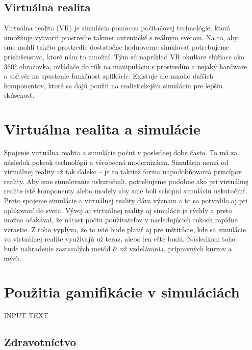 \documentclass[10pt,slovak,a4paper]{article}
\begin{document}
\subsection{Virtuálna realita} \label{Gamification:virtual_reality}

Virtuálna realita (VR) je simulácia pomocou počítačovej technológie, ktorá umožňuje vytvoriť prostredie takmer autentické s reálnym svetom. Na to, aby sme mohli takéto prostredie dostatočne hodnoverne simulovať potrebujeme príslušenstvo, ktoré nám to umožní. Tým sú napríklad VR okuliare slúžiace ako 360° obrazovka, ovládače do rúk na manipuláciu s prostredím a nejaký hardware a softvér na spustenie funkčnosť aplikácie. Existuje ale mnoho ďalších komponentov, ktoré sa dajú použiť na realistickejšiu simuláciu pre lepšiu skúsenosť. 


\section{Virtuálna realita a simulácie} \label{Simulations}

Spojenie virtuálna realita a simulácie počuť v poslednej dobe často. To má za následok pokrok technológií a všeobecná modernizácia. Simulácia nemá od virtuálnej reality až tak ďaleko – je to taktiež forma napodobňovania princípov reality. Aby sme simulovanie uskutočnili, potrebujeme podobne ako pri virtuálnej realite isté komponenty alebo modely aby sme boli schopní simuláciu uskutočniť. Preto spojenie simulácie a virtuálnej reality dáva význam a to sa potvrdilo aj pri aplikovaní do sveta. Vývoj aj virtuálnej reality aj simulácii je rýchly a preto možno očakávať, že nárast počtu používateľov v nasledujúcich rokoch rapídne vzrastie. Z toho vyplýva, že to isté bude platiť aj pre inštitúcie, kde sa simulácie vo virtuálnej realite využívajú už teraz, alebo len ešte budú. Následkom toho bude nahradenie zastaralých metód či už vzdelávania, prípravných kurzov a iných. 


\section{Použitia gamifikácie v simuláciách} \label{Uses}

INPUT TEXT

\subsection{Zdravotníctvo} \label{healthcare}
\end{document}
